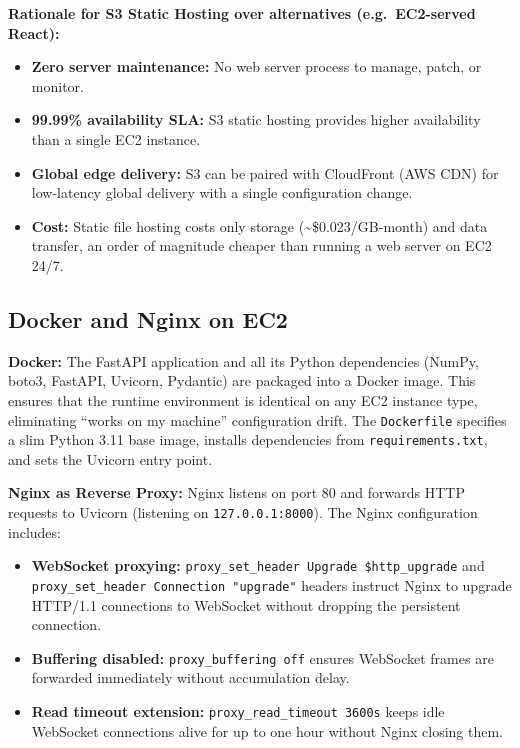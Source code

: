 \textbf{Rationale for S3 Static Hosting over alternatives (e.g.\ EC2-served React):}
\begin{itemize}
    \item \textbf{Zero server maintenance:} No web server process to manage, patch, or monitor.
    \item \textbf{99.99\% availability SLA:} S3 static hosting provides higher availability than a single EC2 instance.
    \item \textbf{Global edge delivery:} S3 can be paired with CloudFront (AWS CDN) for low-latency global delivery with a single configuration change.
    \item \textbf{Cost:} Static file hosting costs only storage (\textasciitilde\$0.023/GB-month) and data transfer, an order of magnitude cheaper than running a web server on EC2 24/7.
\end{itemize}

\subsection{Docker and Nginx on EC2}

\textbf{Docker:} The FastAPI application and all its Python dependencies (NumPy, boto3, FastAPI, Uvicorn, Pydantic) are packaged into a Docker image. This ensures that the runtime environment is identical on any EC2 instance type, eliminating ``works on my machine'' configuration drift. The \texttt{Dockerfile} specifies a slim Python 3.11 base image, installs dependencies from \texttt{requirements.txt}, and sets the Uvicorn entry point.

\textbf{Nginx as Reverse Proxy:} Nginx listens on port 80 and forwards HTTP requests to Uvicorn (listening on \texttt{127.0.0.1:8000}). The Nginx configuration includes:
\begin{itemize}
    \item \textbf{WebSocket proxying:} \texttt{proxy\_set\_header Upgrade \$http\_upgrade} and \texttt{proxy\_set\_header Connection "upgrade"} headers instruct Nginx to upgrade HTTP/1.1 connections to WebSocket without dropping the persistent connection.
    \item \textbf{Buffering disabled:} \texttt{proxy\_buffering off} ensures WebSocket frames are forwarded immediately without accumulation delay.
    \item \textbf{Read timeout extension:} \texttt{proxy\_read\_timeout 3600s} keeps idle WebSocket connections alive for up to one hour without Nginx closing them.
\end{itemize}

